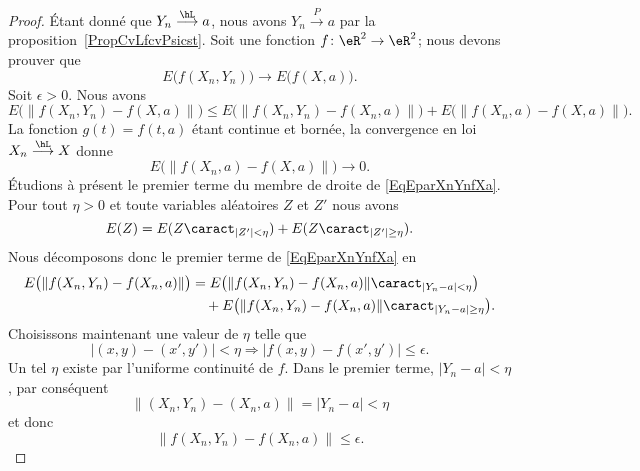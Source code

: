 \begin{proof}
	Étant donné que \( Y_n\stackrel{\hL}{\longrightarrow} a\), nous avons \( Y_n\stackrel{P}{\longrightarrow} a\) par la proposition~\ref{PropCvLfcvPsicst}. Soit une fonction \(f\colon \eR^2\to \eR^2 \); nous devons prouver que
	\begin{equation}
		E\big( f(X_n,Y_n) \big)\to E\big( f(X,a) \big).
	\end{equation}
	Soit \( \epsilon>0\). Nous avons
	\begin{equation}    \label{EqEparXnYnfXa}
		E\big( \| f(X_n,Y_n)-f(X,a) \| \big)\leq E\big(  \| f(X_n,Y_n)-f(X_n,a) \|  \big)+E\big(   \| f(X_n,a)-f(X,a) \|  \big).
	\end{equation}
	La fonction \( g(t)=f(t,a)\) étant continue et bornée, la convergence en loi \( X_n\stackrel{\hL}{\longrightarrow}X\) donne
	\begin{equation}
		E\big( \| f(X_n,a)-f(X,a) \| \big)\to 0.
	\end{equation}
	Étudions à présent le premier terme du membre de droite de \eqref{EqEparXnYnfXa}. Pour tout \( \eta> 0\) et toute variables aléatoires \( Z\) et \( Z'\) nous avons
	\begin{equation}
		E(Z)=E(Z\caract_{| Z' |<\eta})+E(Z\caract_{| Z' |\geq \eta}).
	\end{equation}
	Nous décomposons donc le premier terme de \eqref{EqEparXnYnfXa} en
	\begin{equation}    \label{EqEXnADecomsecvolta}
		\begin{aligned}[]
			E\big( \| f(X_n,Y_n)-f(X_n,a) \| \big) & =E\big( \| f(X_n,Y_n)-f(X_n,a) \|\caract_{| Y_n-a |<\eta} \big)          \\
			                                       & \quad+E\big( \| f(X_n,Y_n)-f(X_n,a) \|\caract_{| Y_n-a |\geq\eta} \big).
		\end{aligned}
	\end{equation}
	Choisissons maintenant une valeur de \( \eta\) telle que
	\begin{equation}
		| (x,y)-(x',y') |<\eta\Rightarrow| f(x,y)-f(x',y') |\leq \epsilon.
	\end{equation}
	Un tel \( \eta\) existe par l'uniforme continuité de \( f\). Dans le premier terme, \( | Y_n-a |<\eta\), par conséquent
	\begin{equation}
		\| (X_n,Y_n)-(X_n,a) \|=| Y_n-a |<\eta
	\end{equation}
	et donc
	\begin{equation}
		\| f(X_n,Y_n)-f(X_n,a) \|\leq \epsilon.
	\end{equation}

\end{proof}
